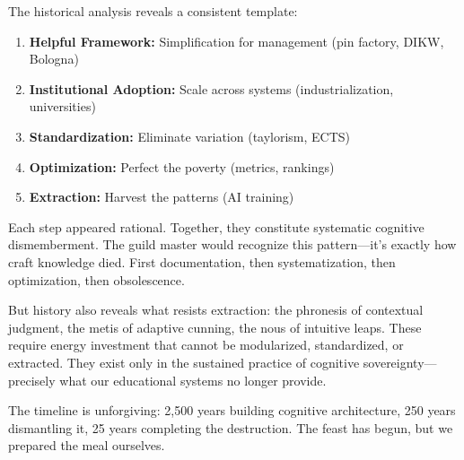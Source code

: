 The historical analysis reveals a consistent template:

\begin{enumerate}
\item \textbf{Helpful Framework:} Simplification for management (pin factory, DIKW, Bologna)
\item \textbf{Institutional Adoption:} Scale across systems (industrialization, universities)
\item \textbf{Standardization:} Eliminate variation (taylorism, ECTS)
\item \textbf{Optimization:} Perfect the poverty (metrics, rankings)
\item \textbf{Extraction:} Harvest the patterns (AI training)
\end{enumerate}

Each step appeared rational. Together, they constitute systematic cognitive dismemberment. The guild master would recognize this pattern---it's exactly how craft knowledge died. First documentation, then systematization, then optimization, then obsolescence.

But history also reveals what resists extraction: the phronesis of contextual judgment, the metis of adaptive cunning, the nous of intuitive leaps. These require energy investment that cannot be modularized, standardized, or extracted. They exist only in the sustained practice of cognitive sovereignty---precisely what our educational systems no longer provide.

The timeline is unforgiving: 2,500 years building cognitive architecture, 250 years dismantling it, 25 years completing the destruction. The feast has begun, but we prepared the meal ourselves.
